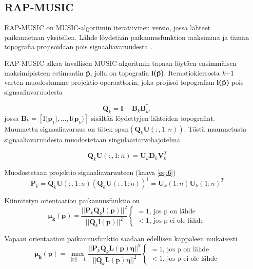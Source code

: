\subsection{RAP-MUSIC}
RAP-MUSIC on MUSIC-algoritmin iteratiivinen versio, jossa lähteet paikannetaan yksitellen. Lähde löydetään paikannusfunktion maksimina ja tämän topografia projisoidaan pois signaaliavaruudesta \citep{Mosher1999SourceMUSIC}. 

RAP-MUSIC alkaa tavallisen MUSIC-algoritmin tapaan löytäen ensimmäisen maksimipisteen estimaatin \textbf{\^p}, jolla on topografia \textbf{l(\^p)}. Iteraatiokierrosta \textit{k}+1 varten muodostamme projektio-operaattorin, joka projisoi topografian \textbf{l(\^p)} pois signaaliavaruudesta

\begin{equation}
    \mathbf{Q}_k = \mathbf{I}-\mathbf{B}_k\mathbf{B}_k^\dagger,
\end{equation}
jossa $\mathbf{B}_k = [\mathbf{l(p}_1),...,\mathbf{l(p}_{k})]$ sisältää löydettyjen lähteiden topografiat. Muunnettu signaaliavaruus on täten $\text{span}(\mathbf{Q}_k\mathbf{U}(:,1:n))$. Tästä muunnetusta signaaliavaruudesta muodostetaan singulaariarvohajotelma

\begin{equation}
    \mathbf{Q}_k\mathbf{U}(:,1:n) = \mathbf{U}_k\mathbf{D}_k\mathbf{V}_k^T
\end{equation}

Muodostetaan projektio signaaliavaruuteen (kaava \ref{eq:6})
\begin{equation}
    \mathbf{P}_k = \mathbf{Q}_k\mathbf{U}(:,1:n)(\mathbf{Q}_k\mathbf{U}(:,1:n))^{\dagger} = \mathbf{U}_k(1:n)\mathbf{U}_k(1:n)^T
\end{equation}

Kiinnitetyn orientaation paikannusfunktio on
\begin{equation}
    \mathbf{\mu_k(p)} = \frac{||\mathbf{P}_k\mathbf{Q}_k\mathbf{l(p)}||^2}{||\mathbf{Q}_k\mathbf{l(p)}||^2}
    \begin{cases}
    =1\text{, jos p on lähde}\\
    <1\text{, jos p ei ole lähde}
     \end{cases}
\end{equation}

Vapaan orientaation paikannusfunktio saadaan edellisen kappaleen mukaisesti
\begin{equation}
    \mathbf{\mu_k(p)} = \max_{||\eta||=1} \frac{||\mathbf{P}_k\mathbf{Q}_k\mathbf{L(p)\eta}||^2}{||\mathbf{Q}_k\mathbf{L(p)\eta}||^2}
    \begin{cases}
    =1\text{, jos p on lähde}\\
    <1\text{, jos p ei ole lähde}
     \end{cases}
\end{equation}



